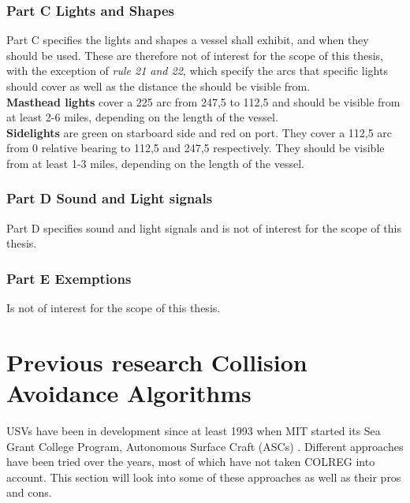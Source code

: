 \subsubsection{Part C Lights and Shapes}
Part C specifies the lights and shapes a vessel shall exhibit, and when they should be used. These are therefore not of interest for the scope of this thesis, with the exception of \textit{rule 21 and 22}, which specify the arcs that specific lights should cover as well as the distance the should be visible from.
\\
\textbf{Masthead lights} cover a 225 \textdegree arc from 247,5 \textdegree to 112,5 \textdegree and should be visible from at least 2-6 miles, depending on the length of the vessel.\\
\textbf{Sidelights} are green on starboard side and red on port. They cover a 112,5 arc from 0 relative bearing to 112,5 and 247,5 respectively. They should be visible from at least 1-3 miles, depending on the length of the vessel.
\subsubsection{Part D Sound and Light signals}
Part D specifies sound and light signals and is not of interest for the scope of this thesis.
\subsubsection{Part E Exemptions}
Is not of interest for the scope of this thesis.



\section{Previous research Collision Avoidance Algorithms}
USVs have been in development since at least 1993 when MIT started its Sea Grant College Program, Autonomous Surface Craft (ASCs) \cite{manley2008unmanned}. Different approaches have been tried over the years, most of which have not taken COLREG into account. This section will look into some of these approaches as well as their pros and cons.

